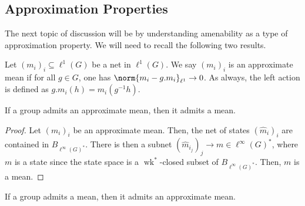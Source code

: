 \documentclass[10pt]{mypackage}
\begin{document}
\subsection{Approximation Properties}%
The next topic of discussion will be by understanding amenability as a type of approximation property. We will need to recall the following two results.
\begin{definition}
  Let $\left( m_i \right)_i\subseteq \ell^1\left(G\right)$ be a net in $\ell^1\left( G \right)$. We say $\left( m_i \right)_i$ is an approximate mean if for all $g\in G$, one has $\norm{m_i - g.m_i}_{\ell^1}\rightarrow 0$. As always, the left action is defined as $g.m_i(h) = m_i\left( g^{-1}h \right)$.
\end{definition}
\begin{theorem}
  If a group admits an approximate mean, then it admits a mean.
\end{theorem}
\begin{proof}
  Let $\left( m_i \right)_i$ be an approximate mean. Then, the net of states $\left( \hat{m}_i \right)_i$ are contained in $B_{\ell^{\infty}\left( G \right)^{\ast}}$. There is then a subnet $\left( \hat{m}_{i_j} \right)_j\rightarrow m\in \ell^{\infty}\left( G \right)^{\ast}$, where $m$ is a state since the state space is a $\operatorname{wk}^{\ast}$-closed subset of $B_{\ell^{\infty}\left( G \right)^{\ast}}$. Then, $m$ is a mean.
\end{proof}
\begin{theorem}
  If a group admits a mean, then it admits an approximate mean.
\end{theorem}
\end{document}

